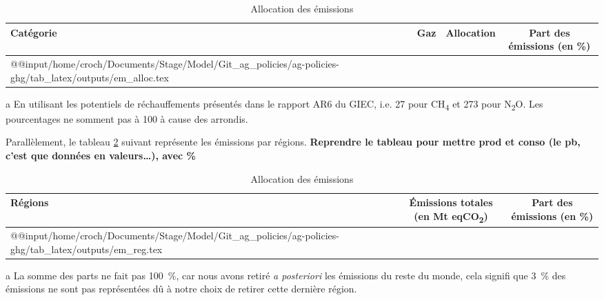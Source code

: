 \begin{table}[h]
    \centering
    \begin{threeparttable}
        \begin{tabularx}{\textwidth}{p{1.5in}p{1.2in}p{1.2in}c}
            \textbf{Catégorie} & \textbf{Gaz} & \textbf{Allocation} & \textbf{Part des émissions}\tnote{a} (en \%) \\ \hline
            \csname @@input\endcsname /home/croch/Documents/Stage/Model/Git_ag_policies/ag-policies-ghg/tab_latex/outputs/em_alloc.tex
            \hline
        \end{tabularx}
        \begin{tablenotes}
            \footnotesize
            \item[a] En utilisant les potentiels de réchauffements présentés dans le rapport AR6 du GIEC, i.e. 27 pour CH\textsubscript{4} et 273 pour N\textsubscript{2}O. Les pourcentages ne somment pas à 100 à cause des arrondis.
        \end{tablenotes}
        \caption{Allocation des émissions}
        \label{tab:em_allocation}
    \end{threeparttable}
\end{table}

Parallèlement, le tableau \ref{tab:em_reg} suivant représente les émissions par régions. \textbf{Reprendre le tableau pour mettre prod et conso (le pb, c'est que données en valeurs\dots), avec \%}

\begin{table}[h]
    \centering
    \begin{threeparttable}
        \begin{tabularx}{\textwidth}{p{1.9in}cc}
            \textbf{Régions} & \textbf{Émissions totales} (en Mt eqCO\textsubscript{2}) & \textbf{Part des émissions}\tnote{a} (en \%) \\ \hline
            \csname @@input\endcsname /home/croch/Documents/Stage/Model/Git_ag_policies/ag-policies-ghg/tab_latex/outputs/em_reg.tex
            \hline
        \end{tabularx}
        \begin{tablenotes}
            \footnotesize
            \item[a] La somme des parts ne fait pas 100~\%, car nous avons retiré \textit{a posteriori} les émissions du reste du monde, cela signifi que 3~\% des émissions ne sont pas représentées dû à notre choix de retirer cette dernière région.
        \end{tablenotes}
        \caption{Allocation des émissions}
        \label{tab:em_reg}
    \end{threeparttable}
\end{table}

